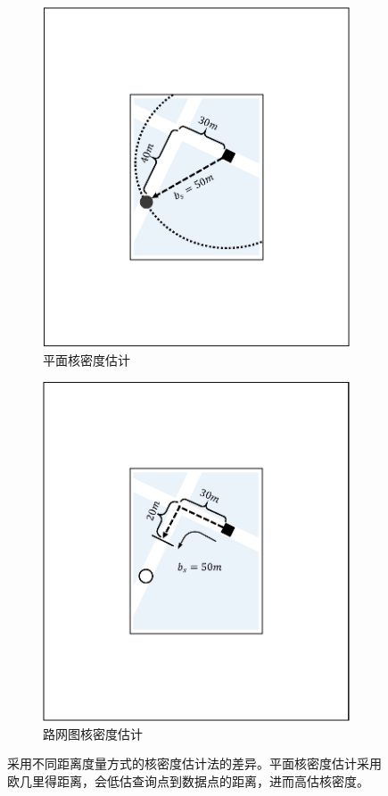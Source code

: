 \begin{itemize}[leftmargin=*]
	\begin{figure}[h!]
		\centering
		\begin{subfigure}{0.4\linewidth}
			\centering
			\includegraphics[width=0.8\linewidth]{figures/sec1_kde1.pdf}
			\caption{平面核密度估计}
			\label{subfig:loss_13}
		\end{subfigure}
		\hspace{1em}
		\begin{subfigure}{0.4\linewidth}
			\centering
			\includegraphics[width=0.8\linewidth]{figures/sec1_kde2.pdf}
			\caption{路网图核密度估计}
			\label{subfig:loss_12}
		\end{subfigure}
		\caption{采用不同距离度量方式的核密度估计法的差异。平面核密度估计采用欧几里得距离，会低估查询点到数据点的距离，进而高估核密度。}
		\label{fig:kde_example}
	\end{figure}


\end{itemize}
